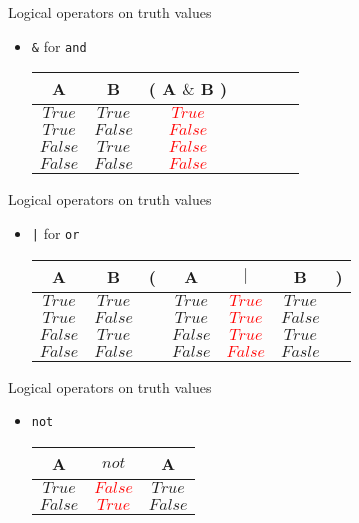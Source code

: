 \documentclass{beamer}
\begin{document}
\begin{slide}{
\item Logical operators on truth values
\begin{itemize}
\item \texttt{\&} for \texttt{and}
\\
\begin{tabular}{@{ }c@{ }@{ }c | c@{}@{ }c@{ }@{ }c@{ }@{ }c@{ }@{}c@{ }}
A & B & ( A $\&$ B ) & \\
\hline 
$True$ & $True$ &  \textcolor{red}{$True$} \\
$True$ & $False$ &  \textcolor{red}{$False$} \\
$False$ & $True$ &  \textcolor{red}{$False$} \\
$False$ & $False$ &  \textcolor{red}{$False$} \\
\end{tabular}
\end{itemize}
}\end{slide}

\begin{slide}{
\item Logical operators on truth values
\begin{itemize}
\item \texttt{|} for \texttt{or}
\\
\begin{tabular}{@{ }c@{ }@{ }c | c@{}@{ }c@{ }@{ }c@{ }@{ }c@{ }@{}c@{ }}
A & B & ( & A & $|$ & B & )\\
\hline 
$True$ & $True$ &  & $True$ & \textcolor{red}{$True$} & $True$ & \\
$True$ & $False$ &  & $True$ & \textcolor{red}{$True$} & $False$ & \\
$False$ & $True$ &  & $False$ & \textcolor{red}{$True$} & $True$ & \\
$False$ & $False$ &  & $False$ & \textcolor{red}{$False$} & $Fasle$ & \\
\end{tabular}
\end{itemize}
}\end{slide}

\begin{slide}{
\item Logical operators on truth values
\begin{itemize}
\item \texttt{not}
\\
\begin{tabular}{@{ }c | c@{ }@{ }c}
A & $not$ & A\\
\hline 
$True$ & \textcolor{red}{$False$} & $True$\\
$False$ & \textcolor{red}{$True$} & $False$\\
\end{tabular}
\end{itemize}
}\end{slide}
\end{document}
